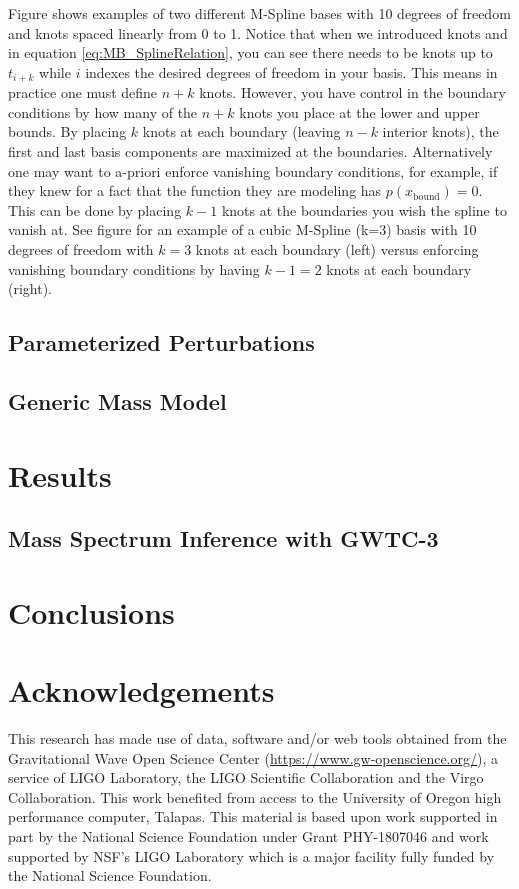 \documentclass[twocolumn, linenumber]{aastex63}
\begin{document}
Figure shows examples of two different M-Spline bases with 10 degrees of freedom and knots spaced linearly from 0 to 1. Notice 
that when we introduced knots and in equation \ref{eq:MB_SplineRelation}, you can see there needs to be knots up to $t_{i+k}$ while $i$ 
indexes the desired degrees of freedom in your basis. This means in practice one must define $n+k$ knots. However, you have control 
in the boundary conditions by how many of the $n+k$ knots you place at the lower and upper bounds. By placing $k$ knots at each boundary 
(leaving $n-k$ interior knots), the first and last basis components are maximized at the boundaries. Alternatively one may want to 
a-priori enforce vanishing boundary conditions, for example, if they knew for a fact that the function they are modeling has 
$p(x_\mathrm{bound}) = 0$.  This can be done by placing $k-1$ knots at the boundaries you wish the spline to vanish at. See figure for 
an example of a cubic M-Spline (k=3) basis with 10 degrees of freedom with $k=3$ knots at each boundary (left) versus enforcing vanishing 
boundary conditions by having $k-1=2$ knots at each boundary (right).


\subsection{Parameterized Perturbations} \label{sec:perturbation_model}
\subsection{Generic Mass Model} \label{sec:nonparametric_model}
\section{Results} \label{sec:results}
\subsection{Mass Spectrum Inference with GWTC-3} \label{sec:GWTC3_inferece}
\section{Conclusions}\label{sec:conclusion}
\section{Acknowledgements}\label{sec:acknowledments}
This research has made use of data, software and/or web tools obtained from the Gravitational Wave Open Science Center 
(\url{https://www.gw-openscience.org/}), a service of LIGO Laboratory, the LIGO Scientific Collaboration and the Virgo Collaboration. 
This work benefited from access to the University of Oregon high performance computer, Talapas.  This material is based upon work supported 
in part by the National Science Foundation under Grant PHY-1807046 and work supported by NSF’s LIGO Laboratory which is a major facility 
fully funded by the National Science Foundation.
{}

\end{document}
